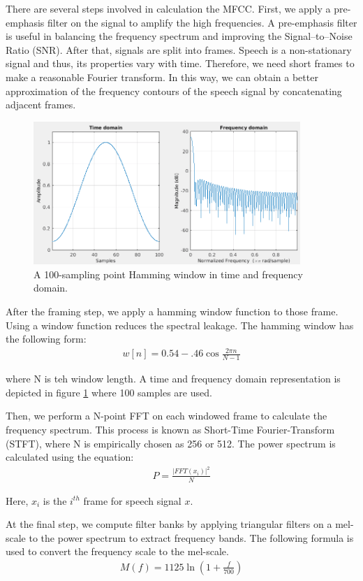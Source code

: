 There are several steps involved in calculation the MFCC. First, we apply a pre-emphasis filter on the signal to amplify the high frequencies. A pre-emphasis filter is useful in balancing the frequency spectrum and improving the Signal--to--Noise Ratio (SNR). After that, signals are split into frames. Speech is a non-stationary signal and thus, its properties vary with time. Therefore, we need short frames to make a reasonable Fourier transform. In this way, we can obtain a better approximation of the frequency contours of the speech signal by concatenating adjacent frames.
\begin{figure}
\centering
   \includegraphics[width=0.9\textwidth]{Figures/Humming.png}
\caption[Humming Window]{A 100-sampling point Hamming window in time and frequency domain. }
\label{fig:humming}
\end{figure}
After the framing step, we apply a hamming window function to those frame. Using a window function reduces the spectral leakage. The hamming window has the following form:
\begin{align}
    w[n] = 0.54 -.46 \cos{\frac{2\pi n}{N-1}}
\end{align}

where N is teh window length. A time and frequency domain representation is depicted in figure \ref{fig:humming} where 100 samples are used. 

Then, we perform a  N-point FFT on each windowed frame to calculate the frequency spectrum. This process is known as Short-Time Fourier-Transform (STFT), where N is empirically chosen as 256 or 512. The power spectrum is calculated using the equation: 
\begin{align}
    P = \frac{|FFT(x_i)|^2}{N}
\end{align}

Here, $x_i$ is the $i^{th}$ frame for speech signal $x$.  

At the final step, we compute filter banks by applying triangular filters on a mel-scale to the power spectrum to extract frequency bands. The following formula is used to convert the frequency scale to the mel-scale.
\begin{align}
    M(f) = 1125\ln({1 + \frac{f}{700}})
\end{align}

